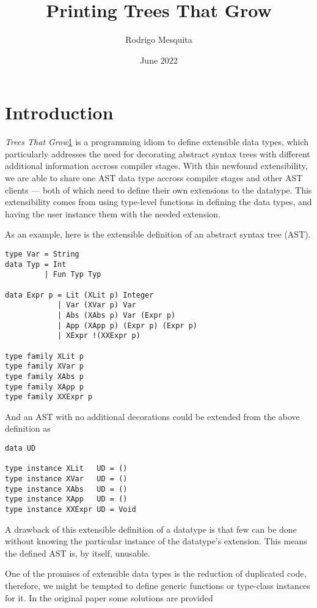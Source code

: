 \documentclass{article}
\title{Printing Trees That Grow}
\author{Rodrigo Mesquita}
\date{June 2022}
\begin{document}
\maketitle

\section{Introduction}

\emph{Trees That Grow}\ref{} is a programming idiom to define extensible data
types, which particularly addresses the need for decorating abstract syntax
trees with different additional information accross compiler stages. With this
newfound extensibility, we are able to share one AST data type accross compiler
stages and other AST clients --- both of which need to define their own
extensions to the datatype. This extensibility comes from using type-level
functions in defining the data types, and having the user instance them with the
needed extension.

As an example, here is the extensible definition of an abstract syntax tree
(AST).

\begin{lstlisting}
type Var = String
data Typ = Int
         | Fun Typ Typ

data Expr p = Lit (XLit p) Integer
            | Var (XVar p) Var
            | Abs (XAbs p) Var (Expr p)
            | App (XApp p) (Expr p) (Expr p)
            | XExpr !(XXExpr p)

type family XLit p
type family XVar p
type family XAbs p
type family XApp p
type family XXExpr p
\end{lstlisting}

And an AST with no additional decorations could be extended from the above
definition as

\begin{lstlisting}
data UD

type instance XLit   UD = ()
type instance XVar   UD = ()
type instance XAbs   UD = ()
type instance XApp   UD = ()
type instance XXExpr UD = Void
\end{lstlisting}

A drawback of this extensible definition of a datatype is that few can be done
without knowing the particular instance of the datatype's extension.
This means the defined AST is, by itself, unusable.

One of the promises of extensible data types is the reduction of duplicated
code, therefore, we might be tempted to define generic functions or type-class
instances for it. In the original paper some solutions are provided
\end{document}

